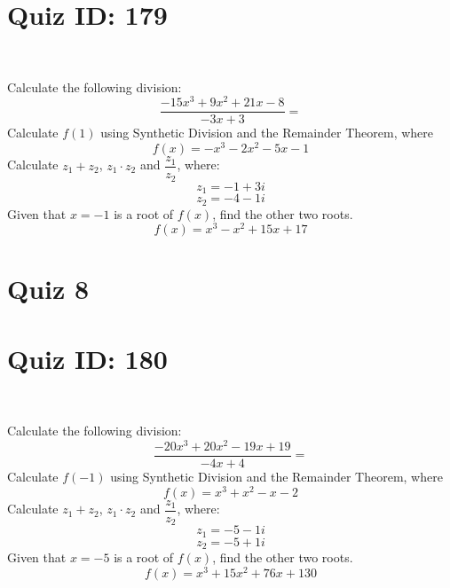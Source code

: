 \documentclass{exam}
\begin{document}
\section*{Quiz ID: 179}
\vspace{0.5cm}\
\vspace{1cm}\
\begin{questions}
\question Calculate the following division:\[\dfrac{
-15x^3 + 9x^2 + 21x - 8}{
-3x + 3}=\] \makeemptybox{\stretch{2}}
\question Calculate $f(1)$ using Synthetic Division and the Remainder Theorem, where\[f(x) = 
-x^3 - 2x^2 - 5x - 1\]
\newpage\question Calculate $z_1+z_2$, $z_1\cdot z_2$ and $\dfrac{z_1}{z_2}$, where:\[z_1=-1+3\mathit{i}\]\[z_2=-4-1\mathit{i}\]
\question Given that $x=-1$ is a root of $f(x)$, find the other two roots.\[f(x)=
x^3 - x^2 + 15x + 17\]\makeemptybox{\stretch{1}}
\end{questions}\newpage
\newpage
\section*{Quiz 8}
\section*{Quiz ID: 180}
\vspace{0.5cm}\
\vspace{1cm}\
\begin{questions}
\question Calculate the following division:\[\dfrac{
-20x^3 + 20x^2 - 19x + 19}{
-4x + 4}=\] 
\question Calculate $f(-1)$ using Synthetic Division and the Remainder Theorem, where\[f(x) = 
x^3 + x^2 - x - 2\]
\newpage\question Calculate $z_1+z_2$, $z_1\cdot z_2$ and $\dfrac{z_1}{z_2}$, where:\[z_1=-5-1\mathit{i}\]\[z_2=-5+1\mathit{i}\]\makeemptybox{\stretch{1}}
\question Given that $x=-5$ is a root of $f(x)$, find the other two roots.\[f(x)=
x^3 + 15x^2 + 76x + 130\]\makeemptybox{\stretch{1}}
\end{questions}\newpage
\end{document}
